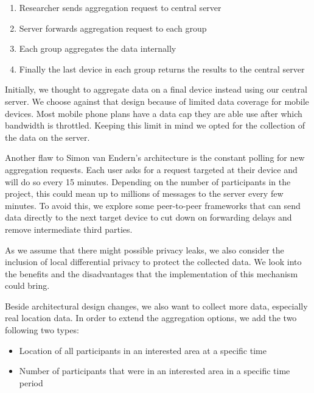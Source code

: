 \begin{enumerate}
	\item Researcher sends aggregation request to central server
	\item Server forwards aggregation request to each group
	\item Each group aggregates the data internally
	\item Finally the last device in each group returns the results to the central server
\end{enumerate}

Initially, we thought to aggregate data on a final device instead using our central server. We choose against that design because of limited data coverage for mobile devices. Most mobile phone plans have a data cap they are able use after which bandwidth is throttled. Keeping this limit in mind we opted for the collection of the data on the server.

Another flaw to Simon van Endern's architecture is the constant polling for new aggregation requests. Each user asks for a request targeted at their device and will do so every 15 minutes. Depending on the number of participants in the project, this could mean up to millions of messages to the server every few minutes. To avoid this, we explore some peer-to-peer frameworks that can send data directly to the next target device to cut down on forwarding delays and remove intermediate third parties.

As we assume that there might possible privacy leaks, we also consider the inclusion of local differential privacy to protect the collected data. We look into the benefits and the disadvantages that the implementation of this mechanism could bring.

Beside architectural design changes, we also want to collect more data, especially real location data. In order to extend the aggregation options, we add the two following two types:
\begin{itemize}
    \item Location of all participants in an interested area at a specific time
    \item Number of participants that were in an interested area in a specific time period
\end{itemize}


